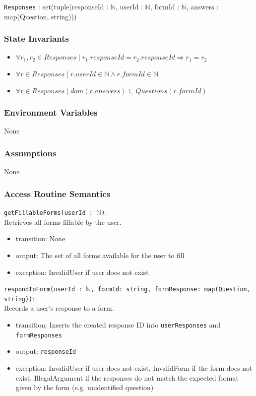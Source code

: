 \documentclass[12pt, titlepage]{article}
\begin{document}
\texttt{Responses} : set(tuple(responseId : $\mathbb{N}$,
                               userId : $\mathbb{N}$,
                               formId : $\mathbb{N}$,
                               answers : map(Question, string)))



\subsubsection{State Invariants}

\begin{itemize}
  \item $\forall r_1, r_2 \in Responses \mid r_1.responseId = r_2.responseId \Rightarrow r_1 = r_2$
  \item $\forall r \in Responses \mid r.userId \in \mathbb{N} \land r.formId \in \mathbb{N}$
  \item $\forall r \in Responses \mid dom(r.answers) \subseteq Questions(r.formId)$
\end{itemize}

\subsubsection{Environment Variables}

None

\subsubsection{Assumptions}

None

\subsubsection{Access Routine Semantics}

\noindent \texttt{getFillableForms(userId : $\mathbb{N}$)}: \\
Retrieves all forms fillable by the user.
\begin{itemize}
\item transition: None
\item output: The set of all forms available for the user to fill
\item exception: InvalidUser if user does not exist
\end{itemize}

\noindent \texttt{respondToForm(userId : $\mathbb{N}$, formId: string, \newline formResponse: map(Question, string))}: \\
Records a user's response to a form.
\begin{itemize}
\item transition: Inserts the created response ID into \texttt{userResponses} and \texttt{formResponses}
\item output: \texttt{responseId}
\item exception: InvalidUser if user does not exist, InvalidForm if the form does not exist, IllegalArgument if the responses do not match the expected format given by the form (e.g. unidentified question)
\end{itemize}
\end{document}
